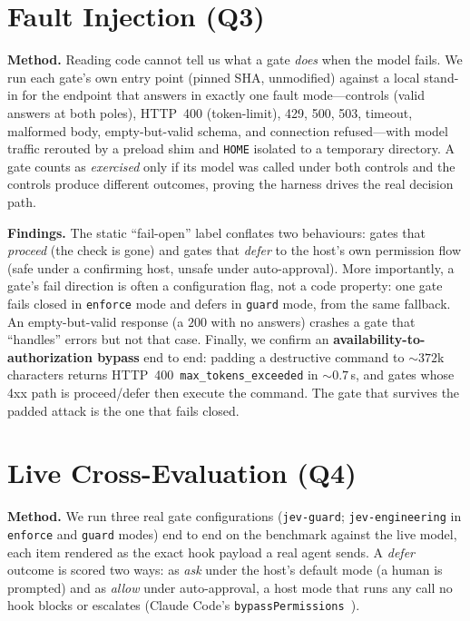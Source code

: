 \documentclass[conference]{IEEEtran}
\newcommand{\gate}[1]{\texttt{#1}}
\newcommand{\code}[1]{\texttt{\small #1}}
\begin{document}
\section{Fault Injection (Q3)}
\label{sec:fault}
\textbf{Method.} Reading code cannot tell us what a gate \emph{does} when the model fails.
We run each gate's own entry point (pinned SHA, unmodified) against a local stand-in for the
endpoint that answers in exactly one fault mode---controls (valid answers at both poles),
HTTP~400 (token-limit), 429, 500, 503, timeout, malformed body, empty-but-valid schema, and
connection refused---with model traffic rerouted by a preload shim and \code{HOME} isolated
to a temporary directory. A gate counts as \emph{exercised} only if its model was called
under both controls and the controls produce different outcomes, proving the harness drives
the real decision path.

\textbf{Findings.} The static ``fail-open'' label conflates two behaviours: gates that
\emph{proceed} (the check is gone) and gates that \emph{defer} to the host's own permission
flow (safe under a confirming host, unsafe under auto-approval). More importantly, a gate's
fail direction is often a configuration flag, not a code property: one gate fails closed in
\code{enforce} mode and defers in \code{guard} mode, from the same fallback. An
empty-but-valid response (a $200$ with no answers) crashes a gate that ``handles'' errors
but not that case. Finally, we confirm an \textbf{availability-to-authorization bypass} end
to end: padding a destructive command to ${\sim}372$k characters returns
HTTP~400~\code{max\_tokens\_exceeded} in ${\sim}0.7$\,s, and gates whose 4xx path is
proceed/defer then execute the command. The gate that survives the padded attack is the one
that fails closed.

\section{Live Cross-Evaluation (Q4)}
\label{sec:live}
\textbf{Method.} We run three real gate configurations (\gate{jev-guard};
\gate{jev-engineering} in \code{enforce} and \code{guard} modes) end to end on the benchmark
against the live model, each item rendered as the exact hook payload a real agent sends. A
\emph{defer} outcome is scored two ways: as \emph{ask} under the host's default mode (a
human is prompted) and as \emph{allow} under auto-approval, a host mode that runs any call
no hook blocks or escalates (Claude Code's \code{bypassPermissions}~\cite{cchooks}).
\end{document}
